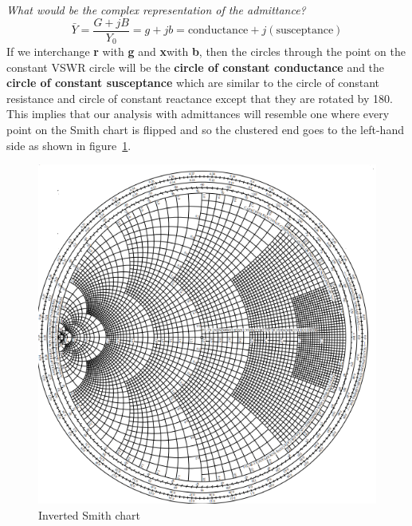 \emph{What would be the complex representation of the admittance?}
\begin{dmath*}
\bar{Y}=\frac{G + jB}{Y_0} = g + jb
= \text{conductance} + j (\text{susceptance})
\end{dmath*}
If we interchange \textbf{r} with \textbf{g} and \textbf{x}with \textbf{b}, then the circles through the point on the constant VSWR circle will be the \textbf{circle of constant conductance} and the \textbf{circle of constant susceptance} which are similar to the circle of constant resistance and circle of constant reactance except that they are rotated by 180\textdegree\;. This implies that our analysis with admittances will resemble one where every point on the Smith chart is flipped and so the clustered end goes to the left-hand side as shown in figure~\ref{fig:invertedsmithchart}.
\begin{figure}[h]
\centering
\includegraphics*[width=0.7\linewidth]{graphics/inverted_smith_chart}
\caption{Inverted Smith chart}\label{fig:invertedsmithchart}
\end{figure}

